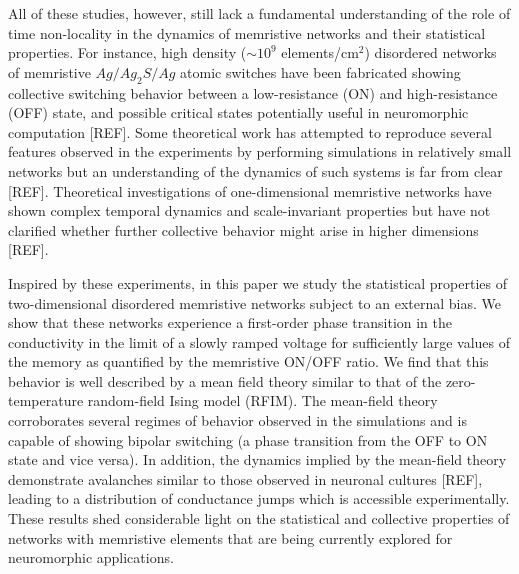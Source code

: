 \documentclass[aps,prl,reprint,groupedaddress]{revtex4-1}
\begin{document}
All of these studies, however, still lack a fundamental understanding of the role of time non-locality in the dynamics of memristive networks and their statistical properties. For instance, high density 
($\sim 10^9$ elements/cm$^2$) disordered networks of memristive $Ag/Ag_2 S/Ag$ atomic
 switches have been fabricated showing collective switching behavior between a low-resistance (ON) and high-resistance (OFF) state, and possible critical states potentially useful in neuromorphic computation [REF]. Some theoretical work 
 has attempted to reproduce several features observed in the experiments by performing simulations in relatively small networks but an understanding of the dynamics of such systems is far from clear [REF]. 
Theoretical investigations of one-dimensional memristive networks have shown
complex temporal dynamics and scale-invariant properties but
have not clarified whether further collective behavior might arise in
higher dimensions [REF]. 

Inspired by these experiments, in this paper we study the statistical properties of two-dimensional disordered memristive networks subject to an external bias. We show that these networks experience a first-order phase transition in the conductivity in the limit of a slowly ramped voltage for
sufficiently large values of the memory as quantified by the memristive ON/OFF ratio.  We find that this behavior is well described by a mean field theory
similar to that of the zero-temperature random-field Ising model (RFIM).
The mean-field theory corroborates several regimes of behavior observed in the simulations and is
capable of showing bipolar switching (a phase transition from the OFF to ON state and
vice versa).  In addition, the dynamics implied by the mean-field theory demonstrate
avalanches similar to those observed in neuronal cultures [REF], leading 
to a distribution of conductance jumps which is accessible experimentally. These results shed considerable light on the statistical and collective properties of networks with memristive elements that are being currently explored for neuromorphic applications. 
\end{document}

